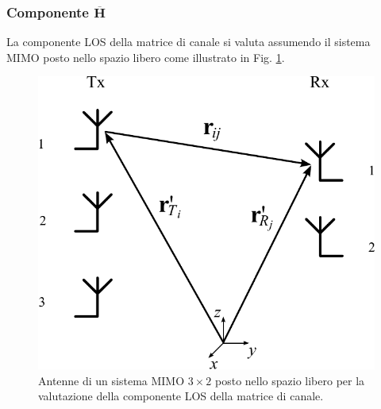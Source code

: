 \documentclass[technote]{IEEEtran}
\newcommand{\mat}[1]{\mathbf{#1}}
\begin{document}
\subsubsection*{Componente $\overline{\mat{H}}$} 
La componente LOS della matrice di canale si valuta assumendo il sistema MIMO posto nello spazio libero come illustrato in Fig. \ref{fig:50}. 

\begin{figure}[!ht]
\centering
\includegraphics[width=.7\columnwidth]{figure50}
\caption{Antenne di un sistema MIMO $3 \times 2$ posto nello spazio libero per la valutazione della componente LOS della matrice di canale.}
\label{fig:50}
\end{figure}
\end{document}
